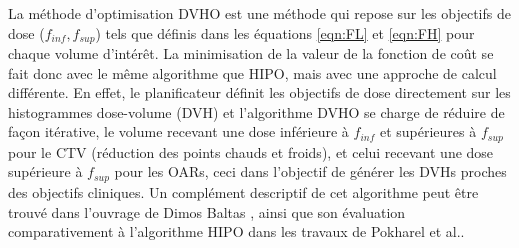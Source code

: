 \begin{itemize}[leftmargin=0pt, label=\textbullet, font=\LARGE]
La méthode d’optimisation DVHO est une méthode qui repose sur les objectifs de dose ($f_{inf}, f_{sup}$) tels que définis dans les équations \eqref{eqn:FL} et \eqref{eqn:FH} pour chaque volume d’intérêt. La minimisation de la valeur de la fonction de coût se fait donc avec le même algorithme que HIPO, mais avec une approche de calcul différente. En effet, le planificateur définit les objectifs de dose directement sur les histogrammes dose-volume (DVH)  et l’algorithme DVHO se charge de réduire de façon itérative, le volume recevant une dose inférieure à $f_{inf}$ et supérieures à $f_{sup}$ pour le CTV (réduction des points chauds et froids), et celui recevant une dose supérieure à $f_{sup}$  pour les OARs, ceci dans l’objectif de générer les DVHs proches des objectifs cliniques. Un complément descriptif de cet algorithme peut être trouvé dans l’ouvrage de Dimos Baltas \cite{Baltas}, ainsi que son évaluation comparativement à l’algorithme HIPO dans les travaux de Pokharel et al.\cite{Pokharel}.
\end{itemize}
% 

